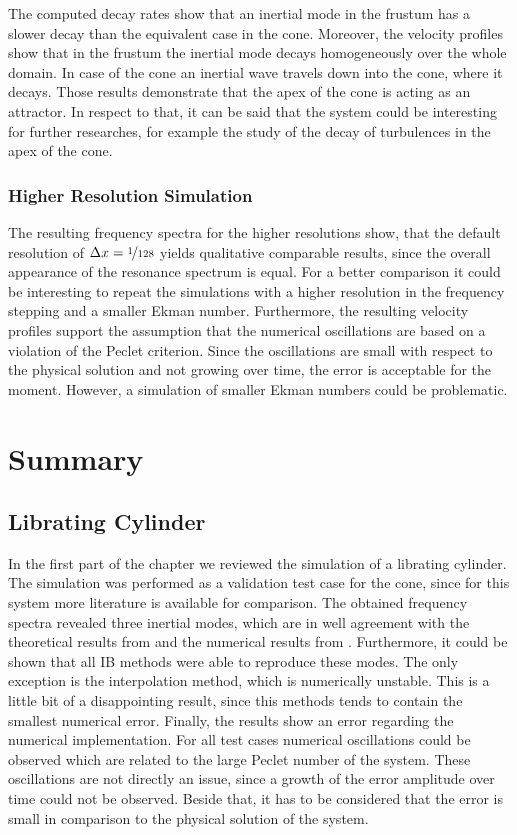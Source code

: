 The computed decay rates show that an inertial mode in the frustum has a slower decay
than the equivalent case in the cone.
Moreover, the velocity profiles show that in the frustum the inertial mode decays homogeneously over the whole domain.
In case of the cone an inertial wave travels down into the cone, where it decays.
Those results demonstrate that the apex of the cone is acting as an attractor.
In respect to that, it can be said that the system could be interesting for further researches,
for example the study of the decay of turbulences in the apex of the cone.

\subsubsection{Higher Resolution Simulation}

The resulting frequency spectra for the higher resolutions show,
that the default resolution of ${\Delta x = \nicefrac{1}{128}}$ yields
qualitative comparable results, since the overall appearance of the resonance spectrum
is equal.
For a better comparison it could be interesting to repeat the simulations with a
higher resolution in the frequency stepping and a smaller Ekman number.
Furthermore, the resulting velocity profiles support the assumption
that the numerical oscillations are based on a violation of the Peclet criterion.
Since the oscillations are small with respect to the physical solution and not
growing over time, the error is acceptable for the moment.
However, a simulation of smaller Ekman numbers could be problematic.
\clearpage

\section{Summary}

\subsection{Librating Cylinder}


In the first part of the chapter we reviewed the simulation of a librating cylinder.
The simulation was performed as a validation test case for the cone,
since for this system more literature is available for comparison.
The obtained frequency spectra revealed three inertial modes,
which are in well agreement with the theoretical results from \citep{Greenspan1990} and the  numerical results from \citep{Sauret2012}.
Furthermore, it could be shown that all IB methods were able to reproduce these modes.
The only exception is the interpolation method, which is numerically unstable.
This is a little bit of a disappointing result, since this methods tends to contain
the smallest numerical error.
Finally, the results show an error regarding the numerical implementation.
For all test cases numerical oscillations could be observed which are related to the
large Peclet number of the system.
These oscillations are not directly an issue, since a growth of the error amplitude over time could not be observed.
Beside that, it has to be considered that the error is small in comparison to the physical solution of the system.

